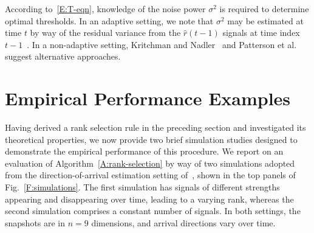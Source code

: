 \documentclass[final]{IEEEtran}
\begin{document}
According to~\eqref{E:T-eqn}, knowledge of the noise power $\sigma^2$ is required to determine optimal thresholds.  In an adaptive setting, we note that $\sigma^2$ may be estimated at time $t$ by way of the residual variance from the $\hat r(t-1)$ signals at time index $t-1$~\cite{rabideau1996fra}.  In a non-adaptive setting, Kritchman and Nadler~\cite{kritchman2008dnc} and Patterson et al.~\cite{patterson2006psa} suggest alternative approaches.


\section{Empirical Performance Examples}
\label{S:emp-perf}

Having derived a rank selection rule in the preceding section and investigated its theoretical properties, we now provide two brief simulation studies designed to demonstrate the empirical performance of this procedure.  We report on an evaluation of Algorithm~\ref{A:rank-selection} by way of two simulations adopted from the direction-of-arrival estimation setting of~\cite{kavcic1996are}, shown in the top panels of Fig.~\ref{F:simulations}.  The first simulation has signals of different strengths appearing and disappearing over time, leading to a varying rank, whereas the second simulation comprises a constant number of signals.  In both settings, the snapshots are in $n = 9$ dimensions, and arrival directions vary over time.
\end{document}
